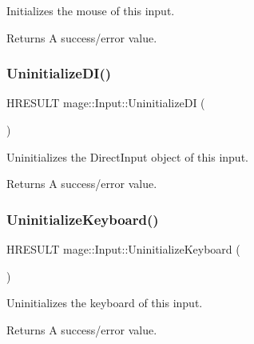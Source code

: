 Initializes the mouse of this input.

\begin{DoxyReturn}{Returns}
A success/error value. 
\end{DoxyReturn}
\hypertarget{classmage_1_1_input_ab4bb88712da71911b5a5fe8e5643ba12}{}\label{classmage_1_1_input_ab4bb88712da71911b5a5fe8e5643ba12} 
\subsubsection{\texorpdfstring{Uninitialize\+D\+I()}{UninitializeDI()}}
{\footnotesize\ttfamily H\+R\+E\+S\+U\+LT mage\+::\+Input\+::\+Uninitialize\+DI (\begin{DoxyParamCaption}{ }\end{DoxyParamCaption})\hspace{0.3cm}{\ttfamily [protected]}}

Uninitializes the Direct\+Input object of this input.

\begin{DoxyReturn}{Returns}
A success/error value. 
\end{DoxyReturn}
\hypertarget{classmage_1_1_input_a2ecac65f7733e361181fecba896ae7bb}{}\label{classmage_1_1_input_a2ecac65f7733e361181fecba896ae7bb} 
\subsubsection{\texorpdfstring{Uninitialize\+Keyboard()}{UninitializeKeyboard()}}
{\footnotesize\ttfamily H\+R\+E\+S\+U\+LT mage\+::\+Input\+::\+Uninitialize\+Keyboard (\begin{DoxyParamCaption}{ }\end{DoxyParamCaption})\hspace{0.3cm}{\ttfamily [protected]}}

Uninitializes the keyboard of this input.

\begin{DoxyReturn}{Returns}
A success/error value. 
\end{DoxyReturn}
\hypertarget{classmage_1_1_input_a364ebf732efbd775e8f91ed646a36412}{}\label{classmage_1_1_input_a364ebf732efbd775e8f91ed646a36412} 
